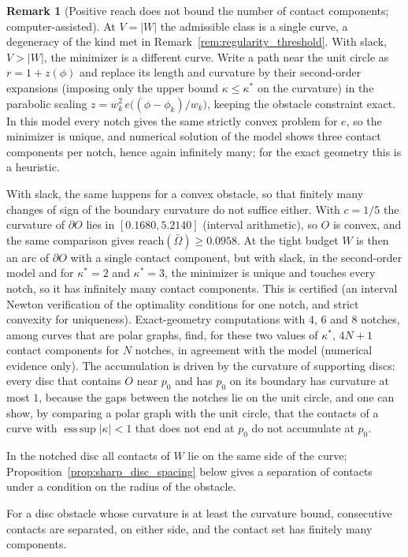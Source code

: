 \documentclass[11pt,reqno]{amsart}
\theoremstyle{definition}
\newtheorem{remark}[theorem]{Remark}
\newcommand{\reach}{\mathrm{reach}}
\numberwithin{equation}{section}
\begin{document}
\begin{remark}[Positive reach does not bound the number of contact components; computer-assisted]
At $V = |W|$ the admissible class is a single curve, a degeneracy of the kind met in Remark~\ref{rem:regularity_threshold}. With slack, $V > |W|$, the minimizer is a different curve. Write a path near the unit circle as $r = 1 + z(\phi)$ and replace its length and curvature by their second-order expansions (imposing only the upper bound $\kappa \le \kappa^*$ on the curvature) in the parabolic scaling $z = w_k^2\,e\big((\phi - \phi_k)/w_k\big)$, keeping the obstacle constraint exact. In this model every notch gives the same strictly convex problem for $e$, so the minimizer is unique, and numerical solution of the model shows three contact components per notch, hence again infinitely many; for the exact geometry this is a heuristic.

With slack, the same happens for a convex obstacle, so that finitely many changes of sign of the boundary curvature do not suffice either. With $c = 1/5$ the curvature of $\partial O$ lies in $[0.1680, 5.2140]$ (interval arithmetic), so $O$ is convex, and the same comparison gives $\reach(\bar\Omega) \ge 0.0958$. At the tight budget $W$ is then an arc of $\partial O$ with a single contact component, but with slack, in the second-order model and for $\kappa^* = 2$ and $\kappa^* = 3$, the minimizer is unique and touches every notch, so it has infinitely many contact components. This is certified (an interval Newton verification of the optimality conditions for one notch, and strict convexity for uniqueness). Exact-geometry computations with $4$, $6$ and $8$ notches, among curves that are polar graphs, find, for these two values of $\kappa^*$, $4N + 1$ contact components for $N$ notches, in agreement with the model (numerical evidence only). The accumulation is driven by the curvature of supporting discs: every disc that contains $O$ near $p_0$ and has $p_0$ on its boundary has curvature at most $1$, because the gaps between the notches lie on the unit circle, and one can show, by comparing a polar graph with the unit circle, that the contacts of a curve with $\operatorname{ess\,sup}|\kappa| < 1$ that does not end at $p_0$ do not accumulate at $p_0$.

In the notched disc all contacts of $W$ lie on the same side of the curve; Proposition~\ref{prop:sharp_disc_spacing} below gives a separation of contacts under a condition on the radius of the obstacle.
\end{remark}

For a disc obstacle whose curvature is at least the curvature bound, consecutive contacts are separated, on either side, and the contact set has finitely many components.
\end{document}
